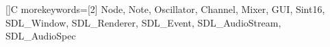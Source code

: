 []{C}{
    morekeywords=[2]{
        Node,
        Note, 
        Oscillator,
        Channel,
        Mixer,
        GUI,
        Sint16,
        SDL_Window,
        SDL_Renderer,
        SDL_Event,
        SDL_AudioStream,
        SDL_AudioSpec
    }
}

